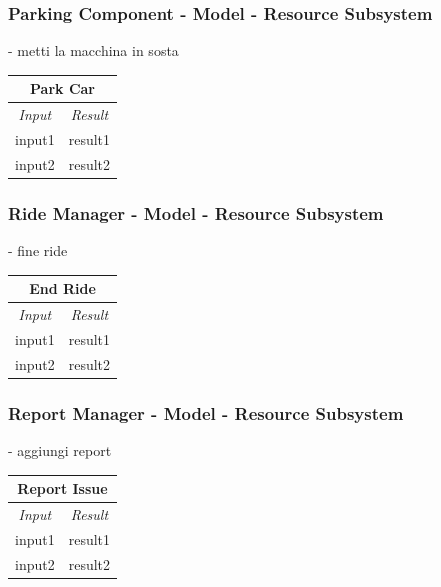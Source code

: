 \documentclass[english]{article}
\begin{document}
\subsubsection{Parking Component - Model - Resource Subsystem}
- metti la macchina in sosta

\begin{center}

	\begin{tabular}{ | p{6cm} | p{6cm} | }
		\hline 


		\hline

		\multicolumn{2}{|c|}{\textbf{Park Car}} \\
		\hline
		\multicolumn{1}{|c|}{\textit{Input}} & \multicolumn{1}{c|}{\textit{Result}} \\
		\hline
		input1 & result1 \\
		\hline
		input2 & result2 \\
		\hline
	\end{tabular}
\end{center}

\subsubsection{Ride Manager - Model - Resource Subsystem}
- fine ride

\begin{center}

	\begin{tabular}{ | p{6cm} | p{6cm} | }
		\hline 


		\hline

		\multicolumn{2}{|c|}{\textbf{End Ride}} \\
		\hline
		\multicolumn{1}{|c|}{\textit{Input}} & \multicolumn{1}{c|}{\textit{Result}} \\
		\hline
		input1 & result1 \\
		\hline
		input2 & result2 \\
		\hline
	\end{tabular}
\end{center}

\subsubsection{Report Manager - Model - Resource Subsystem}
- aggiungi report

\begin{center}

	\begin{tabular}{ | p{6cm} | p{6cm} | }
		\hline 


		\hline

		\multicolumn{2}{|c|}{\textbf{Report Issue}} \\
		\hline
		\multicolumn{1}{|c|}{\textit{Input}} & \multicolumn{1}{c|}{\textit{Result}} \\
		\hline
		input1 & result1 \\
		\hline
		input2 & result2 \\
		\hline
	\end{tabular}
\end{center}
\end{document}
